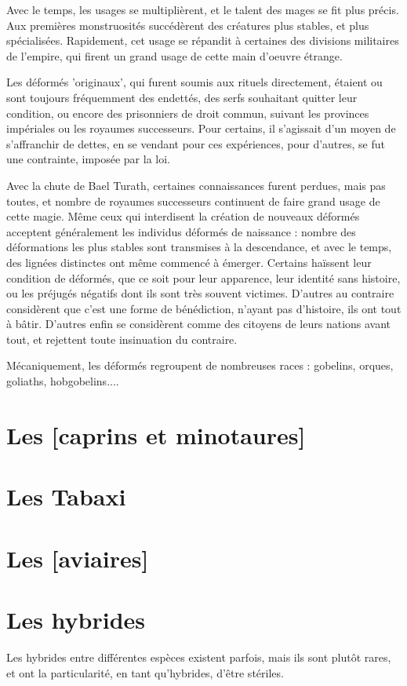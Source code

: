 \documentclass[10pt,a4paper]{book}
\begin{document}
Avec le temps, les usages se multiplièrent, et le talent des mages se fit plus précis. Aux premières monstruosités succédèrent des créatures plus stables, et plus spécialisées. Rapidement, cet usage se répandit à certaines des divisions militaires de l'empire, qui firent un grand usage de cette main d'oeuvre étrange. 

Les déformés 'originaux', qui furent soumis aux rituels directement, étaient ou sont toujours fréquemment des endettés, des serfs souhaitant quitter leur condition, ou encore des prisonniers de droit commun, suivant les provinces impériales ou les royaumes successeurs. Pour certains, il s'agissait d'un moyen de s'affranchir de dettes, en se vendant pour ces expériences, pour d'autres, se fut une contrainte, imposée par la loi.

Avec la chute de Bael Turath, certaines connaissances furent perdues, mais pas toutes, et nombre de royaumes successeurs continuent de faire grand usage de cette magie. Même ceux qui interdisent la création de nouveaux déformés acceptent généralement les individus déformés de naissance : nombre des déformations les plus stables sont transmises à la descendance, et avec le temps, des lignées distinctes ont même commencé à émerger. Certains haïssent leur condition de déformés, que ce soit pour leur apparence, leur identité sans histoire, ou les préjugés négatifs dont ils sont très souvent victimes. D'autres au contraire considèrent que c'est une forme de bénédiction, n'ayant pas d'histoire, ils ont tout à bâtir. D'autres enfin se considèrent comme des citoyens de leurs nations avant tout, et rejettent toute insinuation du contraire.

Mécaniquement, les déformés regroupent de nombreuses races : gobelins, orques, goliaths, hobgobelins....

\section{Les [caprins et minotaures]}
\section{Les Tabaxi}
\section{Les [aviaires]}
\section{Les hybrides}
Les hybrides entre différentes espèces existent parfois, mais ils sont plutôt rares, et ont la particularité, en tant qu'hybrides, d'être stériles. 
\end{document}
